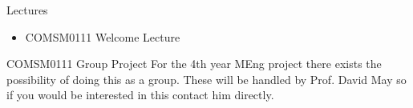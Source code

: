 \documentclass[presentation]{beamer}
\begin{document}
\begin{frame}[label={sec:org0651d99}]{Lectures}
\begin{itemize}
\item COMSM0111 Welcome Lecture
\end{itemize}
\end{frame}


\begin{frame}[label={sec:orge57f171}]{COMSM0111 Group Project}
For the 4th year MEng project there exists the possibility of doing this as a group. These will be handled by Prof. David May so if you would be interested in this contact him directly.
\end{frame}
\end{document}
